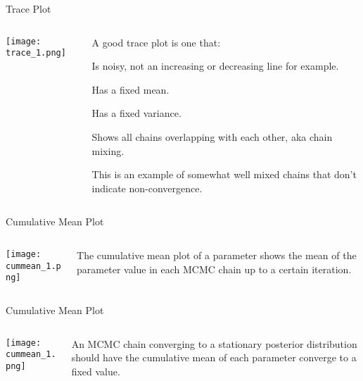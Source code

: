 \begin{frame}{Trace Plot}
    \begin{columns}
        \begin{column}{0.5\textwidth}
            \centering
            \texttt{[image: trace\_1.png]}
        \end{column}
        \begin{column}{0.5\textwidth}
            A good trace plot is one that:
            \vfill
            \begin{vfilleditems}
                \item Is noisy, not an increasing or decreasing line for example.
                \item Has a fixed mean.
                \item Has a fixed variance.
                \item Shows all chains overlapping with each other, aka chain mixing.
            \end{vfilleditems}
            \vfill
            This is an example of somewhat well mixed chains that don't indicate non-convergence.
        \end{column}
    \end{columns}
\end{frame}

\begin{frame}{Cumulative Mean Plot}
    \begin{columns}
        \begin{column}{0.5\textwidth}
            \centering
            \texttt{[image: cummean\_1.png]}
        \end{column}
        \begin{column}{0.5\textwidth}
            The cumulative mean plot of a parameter shows the mean of the parameter value in each MCMC chain up to a certain iteration.
        \end{column}
    \end{columns}
\end{frame}

\begin{frame}{Cumulative Mean Plot}
    \begin{columns}
        \begin{column}{0.5\textwidth}
            \centering
            \texttt{[image: cummean\_1.png]}
        \end{column}
        \begin{column}{0.5\textwidth}
            An MCMC chain converging to a stationary posterior distribution should have the cumulative mean of each parameter converge to a fixed value.
        \end{column}
    \end{columns}
\end{frame}

